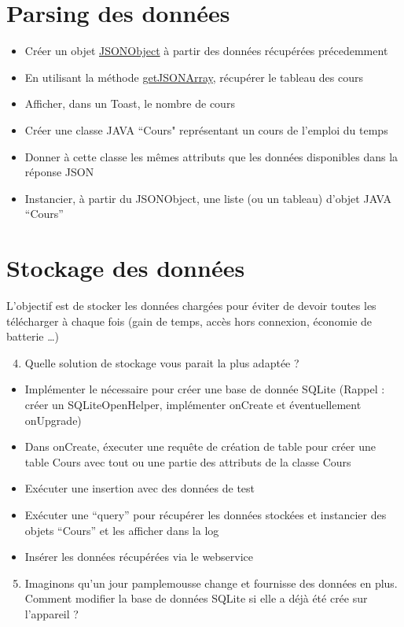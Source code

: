 \documentclass{article}
\begin{document}
\section{Parsing des données}
\begin{itemize} 
  \item Créer un objet
  \href{http://developer.android.com/reference/org/json/JSONObject.html}{JSONObject}
  à partir des données récupérées précedemment
  \item En utilisant la méthode
  \href{http://developer.android.com/reference/org/json/JSONObject.html#getJSONArray(java.lang.String)}{getJSONArray},
  récupérer le tableau des cours  
  \item Afficher, dans un Toast, le nombre de cours  
\end{itemize}
\begin{itemize} 
  \item Créer une classe JAVA ``Cours" représentant un cours de l'emploi du
  temps
  \item Donner à cette classe les mêmes attributs que les données disponibles dans la réponse JSON
  \item Instancier, à partir du JSONObject, une liste (ou un tableau) d'objet
  JAVA ``Cours''
\end{itemize}
\section{Stockage des données}
L'objectif est de stocker les données chargées pour éviter de devoir toutes les
télécharger à chaque fois (gain de temps, accès hors connexion, économie de
batterie \ldots)
\begin{enumerate}
 \setcounter{enumi}{3}
\item Quelle solution de stockage vous parait la plus adaptée ?
\end{enumerate}
\begin{itemize} 
  \item Implémenter le nécessaire pour créer une base de donnée SQLite (Rappel : créer un SQLiteOpenHelper, implémenter onCreate et éventuellement onUpgrade)
  \item Dans onCreate, éxecuter une requête de création de table pour créer
  une table Cours avec tout ou une partie des attributs de la classe Cours 
  \item Exécuter une insertion avec des données de test
  \item Exécuter une ``query'' pour récupérer les données stockées et instancier
  des objets ``Cours'' et les afficher dans la log
  \item Insérer les données récupérées via le webservice
\end{itemize}
\begin{enumerate}
 \setcounter{enumi}{4}
\item Imaginons qu'un jour pamplemousse change et fournisse des
données en plus.\\
Comment modifier la base de données SQLite si elle a déjà été crée sur l'appareil ?
\end{enumerate}
\end{document}
